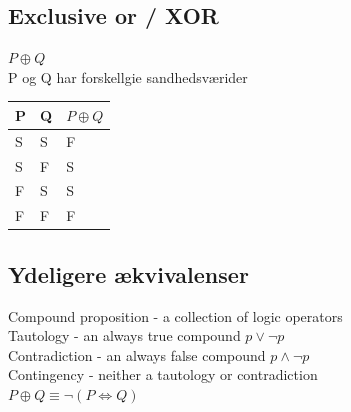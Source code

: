 \documentclass[12pt, a4paper]{article}
\begin{document}
			\subsection{Exclusive or / XOR}
				$P \oplus Q$\\
				P og Q har forskellgie sandhedsværider\\
				\begin{table}[h!]
				\begin{tabular}{|l|l|l|}
				\hline
				P & Q & $P\oplus Q$ \\ \hline
				S & S & F                         \\ \hline
				S & F & S                         \\ \hline
				F & S & S                         \\ \hline
				F & F & F                         \\ \hline
				\end{tabular}
				\end{table}
			\subsection{Ydeligere ækvivalenser}
				Compound proposition - a collection of logic operators\\
				Tautology - an always true compound $p\lor \neg p$\\
				Contradiction - an always false compound $p \land \neg p$\\
				Contingency - neither a tautology or contradiction\\
				$P\oplus Q \equiv \neg(P \iff Q)$\\
\end{document}
